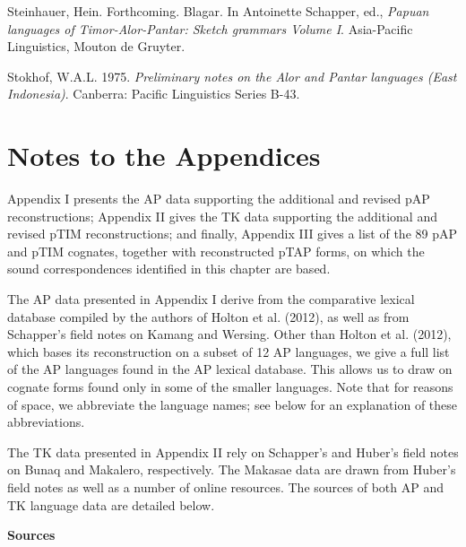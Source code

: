 \documentclass[a4paper]{article}
\begin{document}
Steinhauer, Hein. Forthcoming. Blagar. In Antoinette Schapper, ed., \textit{Papuan languages of Timor-Alor-Pantar: Sketch grammars Volume I}. Asia-Pacific Linguistics, Mouton de Gruyter.

Stokhof, W.A.L. 1975. \textit{Preliminary notes on the Alor and Pantar languages (East Indonesia)}. Canberra: Pacific Linguistics Series B-43.

\clearpage\section[Notes to the Appendices]{Notes to the Appendices}
Appendix I presents the AP data supporting the additional and revised pAP reconstructions; Appendix II gives the TK data supporting the additional and revised pTIM reconstructions; and finally, Appendix III gives a list of the 89 pAP and pTIM cognates, together with reconstructed pTAP forms, on which the sound correspondences identified in this chapter are based. 

The AP data presented in Appendix I derive from the comparative lexical database compiled by the authors of Holton et al. (2012), as well as from Schapper{\textquoteright}s field notes on Kamang and Wersing. Other than Holton et al. (2012), which bases its reconstruction on a subset of 12 AP languages, we give a full list of the AP languages found in the AP lexical database. This allows us to draw on cognate forms found only in some of the smaller languages. Note that for reasons of space, we abbreviate the language names; see below for an explanation of these abbreviations.

The TK data presented in Appendix II rely on Schapper{\textquoteright}s and Huber{\textquoteright}s field notes on Bunaq and Makalero, respectively. The Makasae data are drawn from Huber{\textquoteright}s field notes as well as a number of online resources. The sources of both AP and TK language data are detailed below.

\textbf{Sources}
\end{document}
